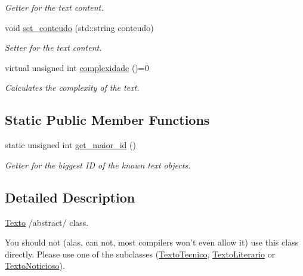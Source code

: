 \begin{DoxyCompactItemize}
\begin{DoxyCompactList}\small\item\em Getter for the text content. \end{DoxyCompactList}\item 
void \hyperlink{class_texto_a94ae33fe47a0ef32a5761a12e097910d}{set\-\_\-conteudo} (std\-::string conteudo)
\begin{DoxyCompactList}\small\item\em Setter for the text content. \end{DoxyCompactList}\item 
virtual unsigned int \hyperlink{class_texto_a92e0fb258179999bc6df2a9da1713a1d}{complexidade} ()=0
\begin{DoxyCompactList}\small\item\em Calculates the complexity of the text. \end{DoxyCompactList}\end{DoxyCompactItemize}
\subsection*{Static Public Member Functions}
\begin{DoxyCompactItemize}
\item 
static unsigned int \hyperlink{class_texto_a674eed23fb437d4f07634f9d6559d325}{get\-\_\-maior\-\_\-id} ()
\begin{DoxyCompactList}\small\item\em Getter for the biggest I\-D of the known text objects. \end{DoxyCompactList}\end{DoxyCompactItemize}


\subsection{Detailed Description}
\hyperlink{class_texto}{Texto} /abstract/ class. 

You should not (alas, can not, most compilers won't even allow it) use this class directly. Please use one of the subclasses (\hyperlink{class_texto_tecnico}{Texto\-Tecnico}, \hyperlink{class_texto_literario}{Texto\-Literario} or \hyperlink{class_texto_noticioso}{Texto\-Noticioso}). 

